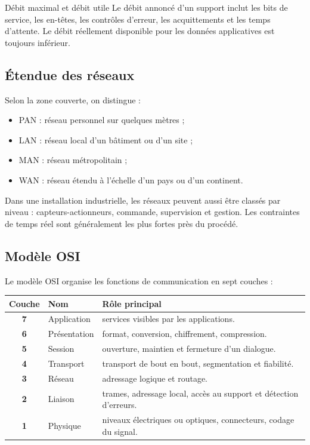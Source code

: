 \begin{TLLogicWarning}{Débit maximal et débit utile}
Le débit annoncé d'un support inclut les bits de service, les en-têtes, les contrôles d'erreur, les acquittements et les temps d'attente. Le débit réellement disponible pour les données applicatives est toujours inférieur.
\end{TLLogicWarning}

\subsection{Étendue des réseaux}

Selon la zone couverte, on distingue :
\begin{itemize}
  \item PAN : réseau personnel sur quelques mètres ;
  \item LAN : réseau local d'un bâtiment ou d'un site ;
  \item MAN : réseau métropolitain ;
  \item WAN : réseau étendu à l'échelle d'un pays ou d'un continent.
\end{itemize}


Dans une installation industrielle, les réseaux peuvent aussi être classés par niveau : capteurs-actionneurs, commande, supervision et gestion. Les contraintes de temps réel sont généralement les plus fortes près du procédé.

\subsection{Modèle OSI}

Le modèle OSI organise les fonctions de communication en sept couches :
\begin{center}\TLModeleOSI\end{center}

\begin{center}
\small
\begin{tabularx}{\linewidth}{>{\bfseries}c p{2.6cm}X}
\toprule
Couche & Nom & Rôle principal \\
\midrule
7 & Application & services visibles par les applications.\\
6 & Présentation & format, conversion, chiffrement, compression.\\
5 & Session & ouverture, maintien et fermeture d'un dialogue.\\
4 & Transport & transport de bout en bout, segmentation et fiabilité.\\
3 & Réseau & adressage logique et routage.\\
2 & Liaison & trames, adressage local, accès au support et détection d'erreurs.\\
1 & Physique & niveaux électriques ou optiques, connecteurs, codage du signal.\\
\bottomrule
\end{tabularx}
\end{center}

